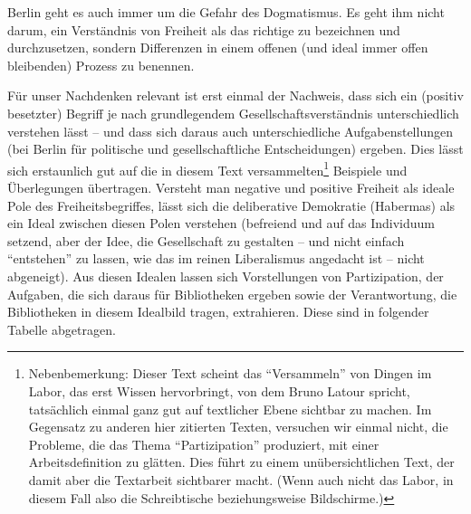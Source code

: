 \documentclass[a4paper,
fontsize=11pt,
oneside,
numbers=noperiodatend,
parskip=half-,
bibliography=totoc,
final
]{scrartcl}
\begin{document}
Berlin geht es auch immer um die Gefahr des Dogmatismus. Es geht ihm
nicht darum, ein Verständnis von Freiheit als das richtige zu bezeichnen
und durchzusetzen, sondern Differenzen in einem offenen (und ideal immer
offen bleibenden) Prozess zu benennen.

Für unser Nachdenken relevant ist erst einmal der Nachweis, dass sich
ein (positiv besetzter) Begriff je nach grundlegendem
Gesellschaftsverständnis unterschiedlich verstehen lässt -- und dass
sich daraus auch unterschiedliche Aufgabenstellungen (bei Berlin für
politische und gesellschaftliche Entscheidungen) ergeben. Dies lässt
sich erstaunlich gut auf die in diesem Text versammelten\footnote{Nebenbemerkung:
  Dieser Text scheint das \enquote{Versammeln} von Dingen im Labor, das
  erst Wissen hervorbringt, von dem Bruno Latour spricht, tatsächlich
  einmal ganz gut auf textlicher Ebene sichtbar zu machen. Im Gegensatz
  zu anderen hier zitierten Texten, versuchen wir einmal nicht, die
  Probleme, die das Thema \enquote{Partizipation} produziert, mit einer
  Arbeitsdefinition zu glätten. Dies führt zu einem unübersichtlichen
  Text, der damit aber die Textarbeit sichtbarer macht. (Wenn auch nicht
  das Labor, in diesem Fall also die Schreibtische beziehungsweise
  Bildschirme.)} Beispiele und Überlegungen übertragen. Versteht man
negative und positive Freiheit als ideale Pole des Freiheitsbegriffes,
lässt sich die deliberative Demokratie (Habermas) als ein Ideal zwischen
diesen Polen verstehen (befreiend und auf das Individuum setzend, aber
der Idee, die Gesellschaft zu gestalten -- und nicht einfach
\enquote{entstehen} zu lassen, wie das im reinen Liberalismus angedacht
ist -- nicht abgeneigt). Aus diesen Idealen lassen sich Vorstellungen
von Partizipation, der Aufgaben, die sich daraus für Bibliotheken
ergeben sowie der Verantwortung, die Bibliotheken in diesem Idealbild
tragen, extrahieren. Diese sind in folgender Tabelle abgetragen.
\end{document}
